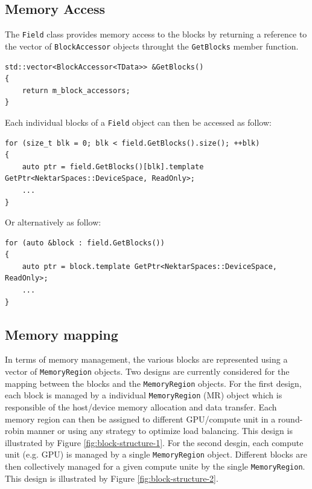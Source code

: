 \subsection{Memory Access}
The \lstinline[style=C++Style]!Field! class provides memory access to the blocks by returning a reference to the vector of \lstinline[style=C++Style]!BlockAccessor! objects throught the \lstinline[style=C++Style]!GetBlocks! member function.
\begin{lstlisting}[style=C++Style]
std::vector<BlockAccessor<TData>> &GetBlocks()
{
    return m_block_accessors;
}
\end{lstlisting}

Each individual blocks of a \lstinline[style=C++Style]!Field! object can then be accessed as follow:
\begin{lstlisting}[style=C++Style]
for (size_t blk = 0; blk < field.GetBlocks().size(); ++blk)
{
    auto ptr = field.GetBlocks()[blk].template GetPtr<NektarSpaces::DeviceSpace, ReadOnly>;
    ...
}
\end{lstlisting}

Or alternatively as follow:
\begin{lstlisting}[style=C++Style]
for (auto &block : field.GetBlocks())
{
    auto ptr = block.template GetPtr<NektarSpaces::DeviceSpace, ReadOnly>;
    ...
}
\end{lstlisting}

\subsection{Memory mapping}
In terms of memory management, the various blocks are represented using a vector of \lstinline[style=C++Style]!MemoryRegion! objects. Two designs are currently considered for the mapping between the blocks and the \lstinline[style=C++Style]!MemoryRegion! objects. For the first design, each block is managed by a individual \lstinline[style=C++Style]!MemoryRegion! (MR) object which is responsible of the host/device memory allocation and data transfer. Each memory region can then be assigned to different GPU/compute unit in a round-robin manner or using any strategy to optimize load balancing. This design is illustrated by Figure \ref{fig:block-structure-1}. For the second desgin, each compute unit (e.g. GPU) is managed by a single \lstinline[style=C++Style]!MemoryRegion! object. Different blocks are then collectively managed for a given compute unite by the single \lstinline[style=C++Style]!MemoryRegion!. This design is illustrated by Figure \ref{fig:block-structure-2}. 


